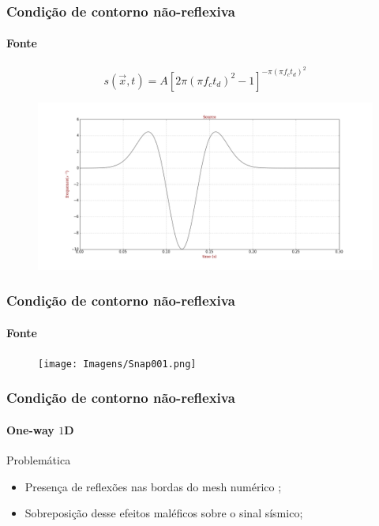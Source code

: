 \documentclass[10pt]{beamer} %
\begin{document}
\begin{frame}
	\frametitle{Condição de contorno não-reflexiva}
	\framesubtitle{Fonte}
	\begin{block}{}
		\begin{equation}
			s(\vec{x},t)=A[2\pi(\pi f_{c} t_{d})^{2}-1]^{- \pi (\pi f_{c} t_{d})^{2}}%
		\end{equation}
		\label{fonte}
	\end{block}
	
	\begin{block}{}
		\begin{figure}[H]
			\centering
			\includegraphics[scale=0.2]{Imagens/fonte.png}
		\end{figure}	
	\end{block}
\end{frame}	
	
\begin{frame}
		\frametitle{Condição de contorno não-reflexiva}
		\framesubtitle{Fonte}
		\begin{block}{}
			\begin{figure}[H]
				\centering
				\texttt{[image: Imagens/Snap001.png]}
			\end{figure}
		\end{block}
\end{frame}
	
	


\begin{frame}
	\frametitle{Condição de contorno não-reflexiva}
	\framesubtitle{One-way $1$D}
	\begin{block}{Problemática}
	\begin{itemize}
	\item Presença de reflexões nas bordas do mesh numérico \citep{Cerjan1985};
	\pause
	\item Sobreposição desse efeitos maléficos sobre o sinal sísmico;
	\pause
	\end{itemize}
	\end{block}

\end{frame}
\end{document}
